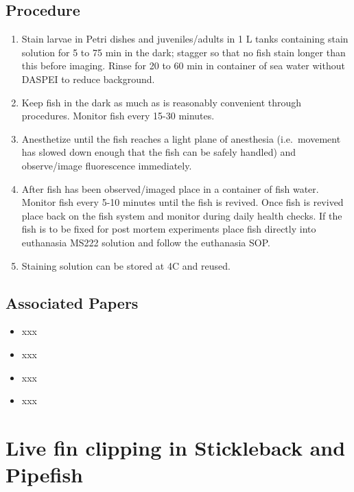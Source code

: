 \documentclass[
  letterpaper,
  DIV=11,
  numbers=noendperiod]{scrreprt}
\providecommand{\tightlist}{%
  \setlength{\itemsep}{0pt}\setlength{\parskip}{0pt}}\usepackage{longtable,booktabs,array}
\begin{document}
\hypertarget{procedure-51}{%
\section{Procedure}\label{procedure-51}}

\begin{enumerate}
\def\labelenumi{\arabic{enumi}.}
\tightlist
\item
  Stain larvae in Petri dishes and juveniles/adults in 1 L tanks
  containing stain solution for 5 to 75 min in the dark; stagger so that
  no fish stain longer than this before imaging. Rinse for 20 to 60 min
  in container of sea water without DASPEI to reduce background.
\item
  Keep fish in the dark as much as is reasonably convenient through
  procedures. Monitor fish every 15-30 minutes.
\item
  Anesthetize until the fish reaches a light plane of anesthesia
  (i.e.~movement has slowed down enough that the fish can be safely
  handled) and observe/image fluorescence immediately.
\item
  After fish has been observed/imaged place in a container of fish
  water. Monitor fish every 5-10 minutes until the fish is revived. Once
  fish is revived place back on the fish system and monitor during daily
  health checks. If the fish is to be fixed for post mortem experiments
  place fish directly into euthanasia MS222 solution and follow the
  euthanasia SOP.
\item
  Staining solution can be stored at 4C and reused.
\end{enumerate}

\hypertarget{associated-papers-34}{%
\section{Associated Papers}\label{associated-papers-34}}

\begin{itemize}
\tightlist
\item
  xxx
\item
  xxx
\item
  xxx
\item
  xxx
\end{itemize}

\hypertarget{sec-vert_exp_live_fin_clipping}{%
\chapter{Live fin clipping in Stickleback and
Pipefish}\label{sec-vert_exp_live_fin_clipping}}
\end{document}
